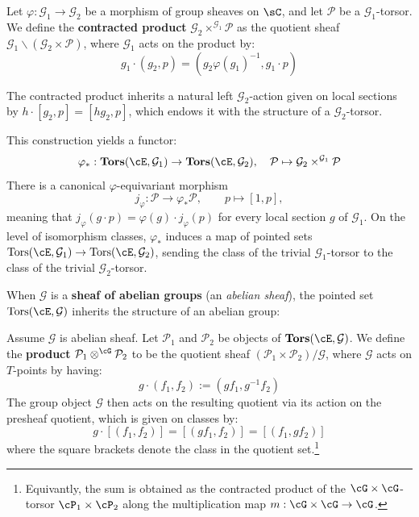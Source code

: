 \begin{definition}
Let $\varphi: \mathcal{G}_1 \to \mathcal{G}_2$ be a morphism of group 
sheaves on $\sC$, and let $\mathcal{P}$ be a $\mathcal{G}_1$-torsor. We define the \textbf{contracted product} $\mathcal{G}_2 \times^{\mathcal{G}_1} \mathcal{P}$ as the quotient sheaf $\mathcal{G}_1 \backslash (\mathcal{G}_2 \times \mathcal{P})$, where $\mathcal{G}_1$ acts on the product by:
\[ g_1 \cdot (g_2, p) = (g_2 \varphi(g_1)^{-1}, g_1 \cdot p) \]

The contracted product inherits a natural left $\mathcal{G}_2$-action given on local sections by $h \cdot [g_2, p] = [h g_2, p]$, which endows it with the structure of a $\mathcal{G}_2$-torsor. 
\end{definition}

This construction yields a functor:
\[ \varphi_*: \mathbf{Tors}(\cE, \mathcal{G}_1) \to \mathbf{Tors}(\cE, \mathcal{G}_2), \quad \mathcal{P} \mapsto \mathcal{G}_2 \times^{\mathcal{G}_1} \mathcal{P} \]
There is a canonical $\varphi$-equivariant morphism
\[
j_\varphi:\mathcal P\longrightarrow\varphi_*\mathcal P,
\qquad p\longmapsto[1,p],
\]
meaning that
$j_\varphi(g\cdot p)=\varphi(g)\cdot j_\varphi(p)$ for every local section
$g$ of $\mathcal G_1$.
On the level of isomorphism classes, $\varphi_*$ induces a map of pointed sets $\mathrm{Tors}(\cE, \mathcal{G}_1) \to \mathrm{Tors}(\cE, \mathcal{G}_2)$, sending the class of the trivial $\mathcal{G}_1$-torsor to the class of the trivial $\mathcal{G}_2$-torsor.

When $\mathcal{G}$ is a \textbf{sheaf of abelian groups} (an \textit{abelian sheaf}), the pointed set $\mathrm{Tors}(\cE, \mathcal{G})$ 
inherits the structure of an abelian group:
\begin{definition}
    Assume $\mathcal{G}$ is abelian sheaf. Let $\mathcal{P}_1$ and $\mathcal{P}_2$ be objects of $\mathbf{Tors}(\cE, \mathcal{G})$. 
    We define the \textbf{product} $\mathcal{P}_1 \otimes^{\cG} \mathcal{P}_2$ to be the quotient sheaf 
    $(\mathcal{P}_1 \times \mathcal{P}_2)/\mathcal{G}$, where $\mathcal{G}$ acts on $T$-points by having:
    \[ g \cdot (f_1, f_2) := (g f_1, g^{-1} f_2) \]
    The group object $\mathcal{G}$ then acts on the resulting quotient via its action on the presheaf quotient, which is given on classes by:
    \[ g \cdot [(f_1, f_2)] = [(g f_1, f_2)] = [(f_1, g f_2)] \]
    where the square brackets denote the class in the quotient set.\footnote{
    Equivantly, the sum is obtained as the contracted product of the $\cG \times \cG$-torsor $\cP_1 \times \cP_2$ along the multiplication map
$m: \cG \times \cG \to \cG$. }
\end{definition}

